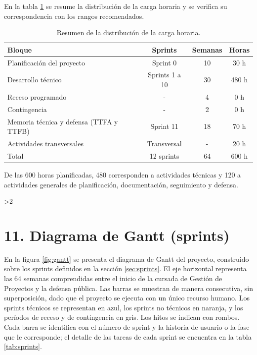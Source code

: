 \documentclass[
11pt, %
]{charter}
\providecommand{\revision}{1}
\begin{document}
En la tabla \ref{tab:resumenSprints} se resume la distribución de la carga horaria y se verifica su correspondencia con los rangos recomendados.

\begin{table}[htpb]
\centering
\caption{Resumen de la distribución de la carga horaria.}
\label{tab:resumenSprints}
\begin{tabularx}{\linewidth}{@{}|X|c|c|c|@{}}
\hline
\rowcolor[HTML]{C0C0C0}
Bloque & Sprints & Semanas & Horas \\ \hline
Planificación del proyecto & Sprint 0 & 10 & 30 h \\ \hline
Desarrollo técnico & Sprints 1 a 10 & 30 & 480 h \\ \hline
Receso programado & - & 4 & 0 h \\ \hline
Contingencia & - & 2 & 0 h \\ \hline
Memoria técnica y defensa (TTFA y TTFB) & Sprint 11 & 18 & 70 h \\ \hline
Actividades transversales & Transversal & - & 20 h \\ \hline
\rowcolor[HTML]{EFEFEF}
Total & 12 sprints & 64 & 600 h \\ \hline
\end{tabularx}
\end{table}

De las 600 horas planificadas, 480 corresponden a actividades técnicas y 120 a actividades generales de planificación, documentación, seguimiento y defensa.
\else\fi

\ifnum\revision>2
\section{11. Diagrama de Gantt (sprints)}
\label{sec:gantt}

En la figura \ref{fig:gantt} se presenta el diagrama de Gantt del proyecto, construido sobre los sprints definidos en la sección \ref{sec:sprints}. El eje horizontal representa las 64 semanas comprendidas entre el inicio de la cursada de Gestión de Proyectos y la defensa pública. Las barras se muestran de manera consecutiva, sin superposición, dado que el proyecto se ejecuta con un único recurso humano. Los sprints técnicos se representan en azul, los sprints no técnicos en naranja, y los períodos de receso y de contingencia en gris. Los hitos se indican con rombos. Cada barra se identifica con el número de sprint y la historia de usuario o la fase que le corresponde; el detalle de las tareas de cada sprint se encuentra en la tabla \ref{tab:sprints}.
\end{document}
